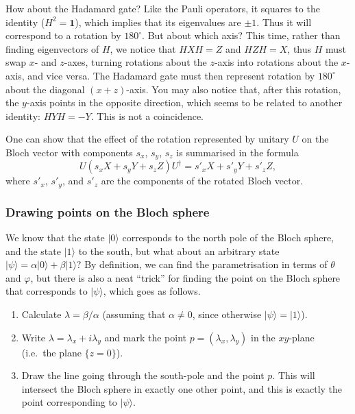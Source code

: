 \documentclass[fleqn]{article}
\providecommand{\tightlist}{%
  \setlength{\itemsep}{0pt}\setlength{\parskip}{0pt}}
\renewcommand{\footnote}[1]{\en{#1}}
\begin{document}
How about the Hadamard gate?
Like the Pauli operators, it squares to the identity (\(H^2=\mathbf{1}\)), which implies that its eigenvalues are \(\pm 1\).
Thus it will correspond to a rotation by \({180}^{\circ}\).
But about which axis?
This time, rather than finding eigenvectors of \(H\), we notice that \(HXH=Z\) and \(HZH=X\), thus \(H\) must swap \(x\)- and \(z\)-axes, turning rotations about the \(z\)-axis into rotations about the \(x\)-axis, and vice versa.
The Hadamard gate must then represent rotation by \({180}^{\circ}\) about the diagonal \((x+z)\)-axis.
You may also notice that, after this rotation, the \(y\)-axis points in the opposite direction, which seems to be related to another identity: \(HYH=-Y\).
This is not a coincidence.

One can show\footnote{Again, see \protect\hyperlink{chapter3}{Chapter 3}.} that the effect of the rotation represented by unitary \(U\) on the Bloch vector with components \(s_x\), \(s_y\), \(s_z\) is summarised in the formula
\[
  U (s_x X + s_y Y + s_z Z) U^\dagger
  = s'_x X+ s'_y Y + s'_z Z,
\]
where \(s'_x\), \(s'_y\), and \(s'_z\) are the components of the rotated Bloch vector.

\hypertarget{drawing-points-on-the-bloch-sphere}{%
\subsubsection{Drawing points on the Bloch sphere}\label{drawing-points-on-the-bloch-sphere}}

We know that the state \(|0\rangle\) corresponds to the north pole of the Bloch sphere, and the state \(|1\rangle\) to the south, but what about an arbitrary state \(|\psi\rangle=\alpha|0\rangle+\beta|1\rangle\)?
By definition, we can find the parametrisation in terms of \(\theta\) and \(\varphi\), but there is also a neat ``trick'' for finding the point on the Bloch sphere that corresponds to \(|\psi\rangle\), which goes as follows.

\begin{enumerate}
\def\labelenumi{\arabic{enumi}.}
\tightlist
\item
  Calculate \(\lambda=\beta/\alpha\) (assuming that \(\alpha\neq0\), since otherwise \(|\psi\rangle=|1\rangle\)).
\item
  Write \(\lambda=\lambda_x+i\lambda_y\) and mark the point \(p=(\lambda_x,\lambda_y)\) in the \(xy\)-plane (i.e.~the plane \(\{z=0\}\)).
\item
  Draw the line going through the south-pole and the point \(p\). This will intersect the Bloch sphere in exactly one other point, and this is exactly the point corresponding to \(|\psi\rangle\).
\end{enumerate}
\end{document}
